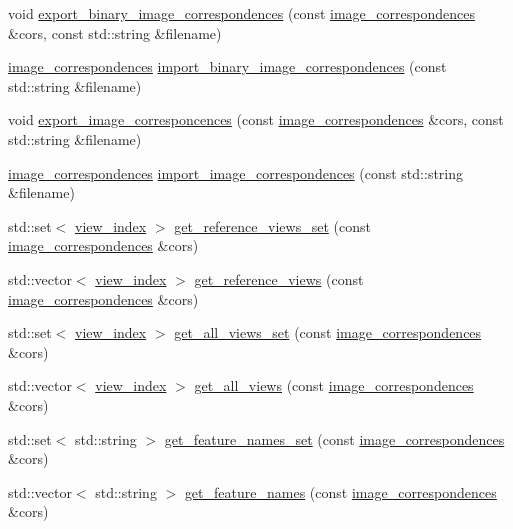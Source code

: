 \begin{DoxyCompactItemize}
void \hyperlink{namespacetlz_a24bb23db2319f38046e6de526a0cb20e}{export\+\_\+binary\+\_\+image\+\_\+correspondences} (const \hyperlink{structtlz_1_1image__correspondences}{image\+\_\+correspondences} \&cors, const std\+::string \&filename)
\item 
\hyperlink{structtlz_1_1image__correspondences}{image\+\_\+correspondences} \hyperlink{namespacetlz_a2ec439452fda5eeb03f60715e50fa96a}{import\+\_\+binary\+\_\+image\+\_\+correspondences} (const std\+::string \&filename)
\item 
void \hyperlink{namespacetlz_a703280f6c42435c957e976f0ab000b30}{export\+\_\+image\+\_\+corresponcences} (const \hyperlink{structtlz_1_1image__correspondences}{image\+\_\+correspondences} \&cors, const std\+::string \&filename)
\item 
\hyperlink{structtlz_1_1image__correspondences}{image\+\_\+correspondences} \hyperlink{namespacetlz_ad75d99f2e1623434fbadee66f3ff29a1}{import\+\_\+image\+\_\+correspondences} (const std\+::string \&filename)
\item 
std\+::set$<$ \hyperlink{structtlz_1_1view__index}{view\+\_\+index} $>$ \hyperlink{namespacetlz_a50da847dcfcd4a37035f36baf5658b0d}{get\+\_\+reference\+\_\+views\+\_\+set} (const \hyperlink{structtlz_1_1image__correspondences}{image\+\_\+correspondences} \&cors)
\item 
std\+::vector$<$ \hyperlink{structtlz_1_1view__index}{view\+\_\+index} $>$ \hyperlink{namespacetlz_a32596acc6a938f73bf6fb8be1591f316}{get\+\_\+reference\+\_\+views} (const \hyperlink{structtlz_1_1image__correspondences}{image\+\_\+correspondences} \&cors)
\item 
std\+::set$<$ \hyperlink{structtlz_1_1view__index}{view\+\_\+index} $>$ \hyperlink{namespacetlz_a5649e44b2c9d8527dcdcc6282b4850c3}{get\+\_\+all\+\_\+views\+\_\+set} (const \hyperlink{structtlz_1_1image__correspondences}{image\+\_\+correspondences} \&cors)
\item 
std\+::vector$<$ \hyperlink{structtlz_1_1view__index}{view\+\_\+index} $>$ \hyperlink{namespacetlz_ace8122bb9e3521f3fbaa00a88a1d5928}{get\+\_\+all\+\_\+views} (const \hyperlink{structtlz_1_1image__correspondences}{image\+\_\+correspondences} \&cors)
\item 
std\+::set$<$ std\+::string $>$ \hyperlink{namespacetlz_a45905d439e8ba051a7159b7fef851eb7}{get\+\_\+feature\+\_\+names\+\_\+set} (const \hyperlink{structtlz_1_1image__correspondences}{image\+\_\+correspondences} \&cors)
\item 
std\+::vector$<$ std\+::string $>$ \hyperlink{namespacetlz_adeaba792165d6750fff2c8a9b692d10b}{get\+\_\+feature\+\_\+names} (const \hyperlink{structtlz_1_1image__correspondences}{image\+\_\+correspondences} \&cors)

\end{DoxyCompactItemize}
